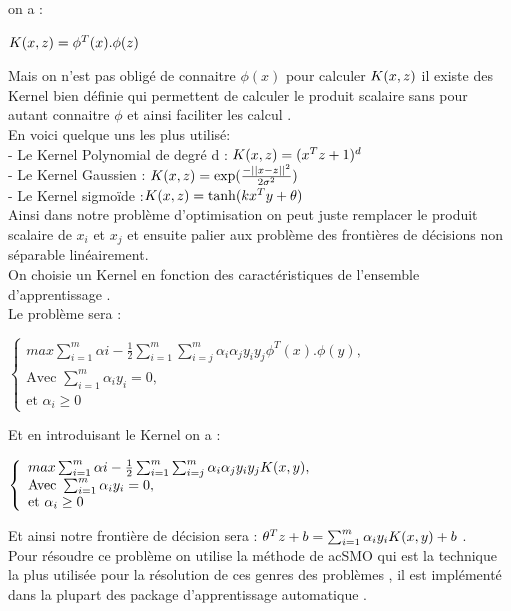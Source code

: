  on a : \\
 \begin{center}
 	${\large K }(x,z ) = {\phi}^{T}(x).{\phi}(z)$
 \end{center} 
 Mais on n'est pas obligé de connaitre ${\phi}(x)$ pour calculer ${\large K }(x,z ) $ il existe des Kernel bien définie qui permettent de calculer le produit scalaire sans pour autant connaitre $\phi$ et ainsi faciliter les calcul .\\
 En voici quelque uns les plus utilisé: \\
 - Le Kernel Polynomial de degré d : ${\large K }(x,z ) =({x}^{T}z+1)^{d}$\\
 - Le Kernel Gaussien :  ${\large K }(x,z ) = \exp( \frac{-{||x-z||}^{2}}{2{\sigma}^{2}})$ \\
 - Le Kernel sigmoïde :${\large K }(x,z ) = \tanh (k{x}^{T}y + \theta)$ \\
 
 Ainsi dans notre problème d'optimisation on peut juste remplacer le produit scalaire de ${x}_{i}$ et ${x}_{j}$ et ensuite palier aux problème des frontières de décisions non séparable linéairement.\\
 On choisie un Kernel en fonction des caractéristiques de l'ensemble d'apprentissage .\\
 Le problème sera    :
 \begin{center}
 	$ \left\{\begin{array}{ll}
 	max \sum _{i=1}^{m} {\alpha}{i} -  \frac{1}{2} \sum _{i=1}^{m} \sum _{i=j}^{m} {\alpha}_{i}{\alpha}_{j}{y}_{i}{y}_{j} {\phi}^{T}(x).{\phi}(y) ,&  \\
 	\mbox{Avec } \sum _{i=1}^{m}{\alpha}_{i}{y}_{i}=0 , & \\
 	\mbox{et }{\alpha}_{i} \ge 0 
 	\end{array}\right.$
 \end{center}
 Et en introduisant le Kernel on a :
  \begin{center}
  	$ \left\{\begin{array}{ll}
  	max \sum _{i=1}^{m} {\alpha}{i} -  \frac{1}{2} \sum _{i=1}^{m} \sum _{i=j}^{m} {\alpha}_{i}{\alpha}_{j}{y}_{i}{y}_{j} {{\large K }(x,y )},&  \\
  	\mbox{Avec } \sum _{i=1}^{m}{\alpha}_{i}{y}_{i}=0 , & \\
  	\mbox{et }{\alpha}_{i} \ge 0 
  	\end{array}\right.$
  \end{center}
  Et ainsi notre frontière de décision sera :
  ${\theta }^{T}{z} + b =  \sum _{i=1}^{m}{\alpha}_{i}{y}_{i}{{\large K }(x,y )} + b $ . \\
  Pour résoudre ce problème on utilise la méthode de ac{SMO} qui est la technique la plus utilisée pour la résolution de ces genres des problèmes , il est implémenté dans la plupart des package d'apprentissage automatique .
  